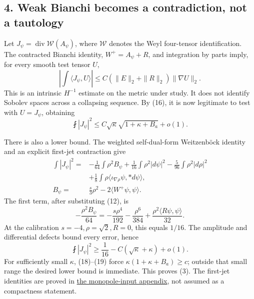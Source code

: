 \documentclass[
  english,
]{article}
\begin{document}
\hypertarget{weak-bianchi-becomes-a-contradiction-not-a-tautology}{%
\subsection{4. Weak Bianchi becomes a contradiction, not a
tautology}\label{weak-bianchi-becomes-a-contradiction-not-a-tautology}}

Let \(J_\psi=\operatorname{div}{\mathcal W}(A_\psi)\), where
\(\mathcal W\) denotes the Weyl four-tensor identification. The
contracted Bianchi identity, \(W^+=A_\psi+R\), and integration by parts
imply, for every smooth test tensor \(U\), \[
 \left|\int\langle J_\psi,U\rangle\right|
     \le C(\|E\|_2+\|R\|_2)\|\nabla U\|_2 .
                                                               \tag{17}
\] This is an intrinsic \(H^{-1}\) estimate on the metric under study.
It does not identify Sobolev spaces across a collapsing sequence. By
(16), it is now legitimate to test with \(U=J_\psi\), obtaining \[
               \fint|J_\psi|^2
                  \le C\sqrt\kappa\sqrt{1+\kappa+B_a}+o(1).
                                                               \tag{18}
\]

There is also a lower bound. The weighted self-dual-form Weitzenböck
identity and an explicit first-jet contraction give \[
 \begin{aligned}
 \int|J_\psi|^2={}&-\frac1{64}\int\rho^2 B_\psi
       +\frac1{16}\int\rho^2|d\psi|^2
       -\frac5{96}\int\rho^2|d\rho|^2\\
       &+\frac18\int\rho
                   \langle\iota_{\nabla\rho}\psi,*d\psi\rangle,\\
 B_\psi={}&\frac{s}{3}\rho^2-2\langle W^+\psi,\psi\rangle .
 \end{aligned}
\] The first term, after substituting (12), is \[
 -\frac{\rho^2B_\psi}{64}
   =-\frac{s\rho^4}{192}-\frac{\rho^6}{384}
                          +\frac{\rho^2\langle R\psi,\psi\rangle}{32}.
\] At the calibration \(s=-4,\rho=\sqrt2,R=0\), this equals \(1/16\).
The amplitude and differential defects bound every error, hence \[
                   \fint|J_\psi|^2
                       \ge\frac1{16}-C(\sqrt\kappa+\kappa)+o(1).
                                                               \tag{19}
\] For sufficiently small \(\kappa\), (18)--(19) force
\(\kappa(1+\kappa+B_a)\ge c\); outside that small range the desired
lower bound is immediate. This proves (3). The first-jet identities are
proved in \href{../proofs/round3_monopole_input.md}{the monopole-input
appendix}, not assumed as a compactness statement.
\end{document}
